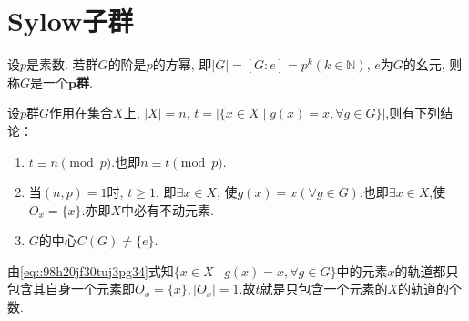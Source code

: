 \documentclass[../../main.tex]{subfiles}%
\begin{document}
\section{Sylow子群}

\begin{definition}[$p$群]
设$p$是素数. 若群$G$的阶是$p$的方幂, 即$|G|=[G:e]=p^k(k\in\mathbb{N})$, $e$为$G$的幺元, 则称$G$是一个$\boldsymbol{p}$\textbf{群}.
\end{definition}

\begin{theorem}\label{theorem:抽象代数--定理4.3.1}
设$p$群$G$作用在集合$X$上, $|X|=n$, $t=|\{x\in X\mid g(x)=x, \forall g\in G\}|$,则有下列结论：
\begin{enumerate}[(1)]
\item\label{theorem:抽象代数--定理4.3.1-1} $t\equiv n\pmod{p}$.也即$n\equiv t\pmod{p}$. \label{eq:::09jf0r2g4h4hj4.3.1}

\item\label{theorem:抽象代数--定理4.3.1-2} 当$(n,p)=1$时, $t\geqslant 1$. 即$\exists x\in X$, 使$g(x)=x(\forall g\in G)$.也即$\exists x\in X$,使$O_x=\{x\}$.亦即$X$中必有不动元素.

\item\label{theorem:抽象代数--定理4.3.1-3} $G$的中心$C(G)\neq \{e\}$.
\end{enumerate}
\end{theorem}
\begin{remark}
由\eqref{eq::98h20jf30tuj3pg34}式知$\{x\in X\mid g(x)=x, \forall g\in G\}$中的元素$x$的轨道都只包含其自身一个元素即$O_x=\{x\},|O_x|=1.$故$t$就是只包含一个元素的$X$的轨道的个数.
\end{remark}
\end{document}
